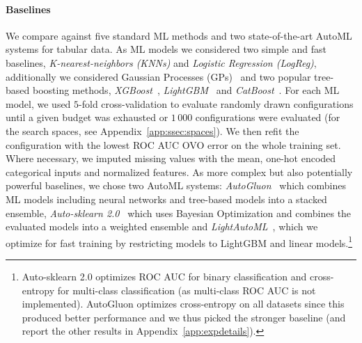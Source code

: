 \documentclass{article}
\begin{document}
\paragraph{Baselines} We compare against five standard ML methods and two state-of-the-art AutoML systems for tabular data. As ML models we considered two simple and fast baselines, \textit{K-nearest-neighbors (KNNs)} and \textit{Logistic Regression (LogReg)}, additionally we considered Gaussian Processes (GPs)~\citep{rasmussen-book06a} and two popular tree-based boosting methods, \textit{XGBoost}~\citep{chen-arxiv20a}, \textit{LightGBM}~\citep{NIPS2017_6449f44a} and \textit{CatBoost}~\citep{prokhorenkova-neurips18a}.
For each ML model, we used $5$-fold cross-validation to evaluate randomly drawn configurations until a given budget was exhausted or $1\,000$ configurations were evaluated (for the search spaces, see Appendix~\ref{app:ssec:spaces}). We then refit the configuration with the lowest ROC AUC OVO error on the whole training set. Where necessary, we imputed missing values with the mean, one-hot encoded categorical inputs and normalized features.
As more complex but also potentially powerful baselines, we chose two AutoML systems: \textit{AutoGluon}~\citep{erickson-arxiv20a} which combines ML models including neural networks and tree-based models into a stacked ensemble, \textit{Auto-sklearn 2.0}~\citep{feurer-nips2015a,feurer-arxiv20v2} which uses Bayesian Optimization and combines the evaluated models into a weighted ensemble and \textit{LightAutoML}~\citep{DBLP:journals/corr/abs-2109-01528}, which we optimize for fast training by restricting models to LightGBM and linear models.\footnote{Auto-sklearn 2.0 optimizes ROC AUC for binary classification and cross-entropy for multi-class classification (as multi-class ROC AUC is not implemented). AutoGluon optimizes cross-entropy on all datasets since this produced better performance and we thus picked the stronger baseline (and report the other results in Appendix~\ref{app:expdetails}).
}
\end{document}
